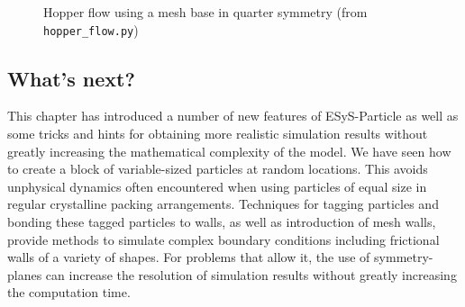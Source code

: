 \begin{figure}
\begin{center}
\end{center}
\caption{Hopper flow using a mesh base in quarter symmetry (from \texttt{hopper\_flow.py})} \label{fig:hopper_flow}
\end{figure}

\subsection*{What's next?}

This chapter has introduced a number of new features of ESyS-Particle as well as some tricks and hints for obtaining more realistic simulation results without greatly increasing the mathematical complexity of the model. We have seen how to create a block of variable-sized particles at random locations. This avoids unphysical dynamics often encountered when using particles of equal size in regular crystalline packing arrangements. Techniques for tagging particles and bonding these tagged particles to walls, as well as introduction of mesh walls, provide methods to simulate complex boundary conditions including frictional walls of a variety of shapes. For problems that allow it, the use of symmetry-planes can increase the resolution of simulation results without greatly increasing the computation time.  


